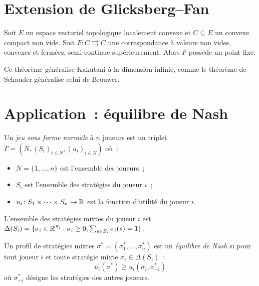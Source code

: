 \section{Extension de Glicksberg--Fan}

\begin{theoreme}
\label{thm:glicksberg-fan}
Soit $E$ un espace vectoriel topologique localement convexe et $C \subseteq E$ un convexe
compact non vide. Soit $F\colon C \rightrightarrows C$ une correspondance \`a valeurs non
vides, convexes et ferm\'ees, semi-continue sup\'erieurement. Alors $F$ poss\`ede un point
fixe.
\end{theoreme}

\begin{remarque}
Ce th\'eor\`eme g\'en\'eralise Kakutani \`a la dimension infinie, comme le th\'eor\`eme
de Schauder g\'en\'eralise celui de Brouwer.
\end{remarque}

\section{Application~: \'equilibre de Nash}

\begin{definition}
Un \emph{jeu sous forme normale} \`a $n$ joueurs est un triplet
$\Gamma = (N, (S_i)_{i \in N}, (u_i)_{i \in N})$ o\`u~:
\begin{itemize}
  \item $N = \{1, \ldots, n\}$ est l'ensemble des joueurs~;
  \item $S_i$ est l'ensemble des strat\'egies du joueur $i$~;
  \item $u_i\colon S_1 \times \cdots \times S_n \to \mathbb{R}$ est la fonction d'utilit\'e du
    joueur $i$.
\end{itemize}
L'ensemble des strat\'egies mixtes du joueur $i$ est $\Delta(S_i) = \{\sigma_i \in \mathbb{R}^{S_i}
: \sigma_i \geq 0, \sum_{s \in S_i} \sigma_i(s) = 1\}$.
\end{definition}

\begin{definition}
Un profil de strat\'egies mixtes $\sigma^* = (\sigma_1^*, \ldots, \sigma_n^*)$ est un
\emph{\'equilibre de Nash} si pour tout joueur $i$ et toute strat\'egie mixte
$\sigma_i \in \Delta(S_i)$~:
\[
  u_i(\sigma^*) \geq u_i(\sigma_i, \sigma_{-i}^*)
\]
o\`u $\sigma_{-i}^*$ d\'esigne les strat\'egies des autres joueurs.
\end{definition}

